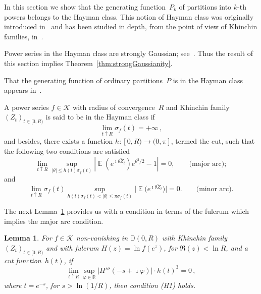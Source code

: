 \documentclass[12pt]{amsart}
\newtheorem{lemma}{Lemma}[section]
\theoremstyle{definition}
\DeclareMathOperator{\E}{\mathbb{E}}
\begin{document}
In this section we show that the generating function~$P_k$ of partitions into $k$-th powers
belongs to the Hayman class. This notion of Hayman class was originally introduced
in~\cite{Hayman} and has been studied in depth, from the point of view of Khinchin families, in~\cite{CFMK}.

Power series in the Hayman class are strongly Gaussian; see~\cite[Theorem~3.8]{CFMK}. Thus the
result of this section implies Theorem~\ref{thm:strongGaussianity}.

That the generating function of ordinary partitions~$P$ is in the Hayman class appears
in~\cite[Thm.~6.2]{CFMK}.

A power series $f\in\mathcal{K}$ with radius of convergence~$R$ and Khinchin family $(Z_t)_{t\in[0,R)}$
is said to be in the Hayman class if
\begin{equation}\tag{H0}
\lim_{t\uparrow R} \sigma_f(t) = +\infty\,,
\end{equation}
and besides, there exists a function $h\colon [0,R)\to(0,\pi]$, termed the cut, such that the
following two conditions are satisfied
\begin{equation}\tag{H1}
\lim_{t\uparrow R} \sup_{|\theta|\le h(t)\sigma_f(t)} \left|\E\!\left(e^{\imath\theta\breve{Z}_t}\right) e^{\theta^2/2} - 1\right| = 0, \qquad \text{(major arc)};
\end{equation}
and
\begin{equation}\tag{H2}
\lim_{t\uparrow R} \sigma_f(t) \sup_{h(t)\sigma_f(t)<|\theta|\le\pi\sigma_f(t)} \big|\E\!\big(e^{\imath\theta\breve{Z}_t}\big)\big| = 0. \qquad \text{(minor arc)}.
\end{equation}

\smallskip

The next Lemma~\ref{lem:majorarc} provides us with a condition in terms of the fulcrum which implies the
major arc condition.

\begin{lemma}\label{lem:majorarc}
For $f\in\mathcal{K}$ \emph{non-vanishing} in $\mathbb{D}(0,R)$ with Khinchin family $(Z_t)_{t\in[0,R)}$ and
with fulcrum $H(z) = \ln f(e^z)$, for $\Re(z)<\ln R$, and a cut function~$h(t)$, if
\begin{equation}\label{eq:majorarccond}
\lim_{t\uparrow R} \sup_{\varphi\in\mathbb{R}} |H'''(-s+\imath\varphi)| \cdot h(t)^3 = 0\,,
\end{equation}
where $t=e^{-s}$, for $s>\ln(1/R)$, then condition \textup{(H1)} holds.
\end{lemma}
\end{document}
